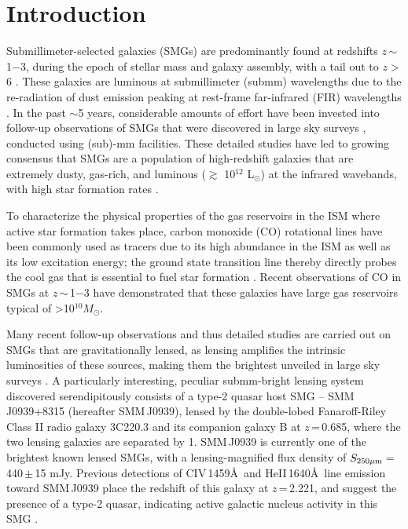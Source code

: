 \documentclass[twocolumn,apj,numberedappendix]{emulateapj}
\newcommand{\Msun}{\mbox{$M_{\odot}$}}
\newcommand{\Lsun}{\mbox{L$_{\odot}$}}
\newcommand{\eg}{{\sl e.g.,~}}
\newcommand{\pmOne}{\mbox{$^{-1}$}}
\begin{document}
\section{Introduction}\label{sec:intro}
Submillimeter-selected galaxies (SMGs) are predominantly found at redshifts $z$\,$\sim$\,1$-$3, during the epoch of stellar mass and 
galaxy assembly, with a tail out to $z>$ 6 \citep{Riechers13a}. 
These galaxies are luminous at submillimeter (submm) wavelengths due to the re-radiation of dust emission peaking at 
rest-frame far-infrared (FIR) wavelengths \citep{blain02a}. 
In the past $\sim$5\,\,years, considerable amounts of effort have been invested into follow-up observations of SMGs that were 
discovered in large sky surveys \citep[\eg H-ATLAS, HerMES; ][]{Eales10a,Oliver12a}, conducted using (sub)-mm facilities. These detailed studies have led to growing consensus that SMGs are a population of high-redshift galaxies that are extremely dusty, gas-rich, 
  and luminous ($\gtrsim$ 10$^{12}$ \Lsun) at the infrared wavebands, with high star formation rates \citep[$\gtrsim $ 500 \Msun yr\pmOne; \eg][]{Lagache05a}.
  
  To characterize the physical properties of the gas reservoirs in the ISM where active star formation takes place, carbon monoxide (CO) rotational lines have been commonly used as tracers due to its high abundance in the ISM as well as its low excitation energy; the ground state transition line thereby directly probes the cool gas that is essential to fuel star formation \citep[See \eg][]{Carilli13a}. Recent observations of CO in SMGs at $z$\,$\sim$\,1$-$3 have demonstrated that these galaxies have large gas reservoirs typical of \textgreater 10$^{10}$\Msun \citep[\eg][]{Riechers11c,Riechers11d,Ivison11a,Bothwell13a}. 

Many recent follow-up observations and thus detailed studies are carried out on SMGs that are gravitationally lensed,
 as lensing amplifies the intrinsic luminosities of these sources, making them the brightest unveiled in large sky surveys \citep{Negrello10a,Vieira10a,Oliver12a}. 
A particularly interesting, peculiar submm-bright lensing system discovered serendipitously  
consists of a type-2 quasar host SMG -- SMM\,J0939+8315 (hereafter SMM\,J0939), lensed by the double-lobed Fanaroff-Riley 
Class II \citep*[FR-II; ][]{Fanaroff74} radio galaxy 3C220.3 and its
companion galaxy B at $z$\,=\,0.685, where the two lensing galaxies are separated by 1. 
SMM\,J0939 is currently one of the brightest known lensed
SMGs, with a lensing-magnified flux density of $S_{\rm 250\mu m}$\,=\,440\,$\pm$\,15 mJy. 
Previous detections of CIV\,1459\AA\
 and HeII\,1640\AA\ line emission toward SMM\,J0939 
 place the redshift of this galaxy at $z$\,=\,2.221, and suggest the presence of a type-2 quasar,  
indicating active galactic nucleus activity in this SMG \citep[hereafter H14]{Haas14}.
\end{document}
